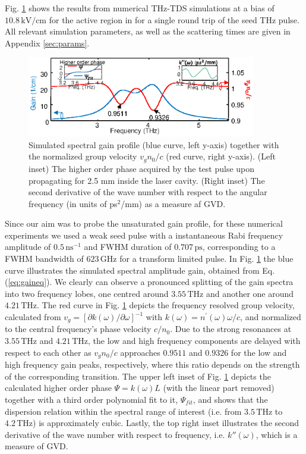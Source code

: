 \documentclass[10pt]{article}
\begin{document}
	Fig. \ref{fig:img03} shows the results from numerical THz-TDS simulations at a
	bias of $10.8{\,}\mathrm{kV/cm}$ for the active region in
	\cite{burghoff2014terahertz} for a single round trip of the seed THz
	pulse\textrm{.} All relevant simulation parameters, as well as the scattering
	times are given in Appendix \ref{sec:params}.
	
	\begin{figure}[h!]
		\begin{center}
			\includegraphics[width=10cm]{THZtds.eps}
		\end{center}
		\caption{Simulated spectral gain profile (blue curve, left y-axis) together
			with the normalized group velocity $v_{g}n_{0}/c$ (red curve, right y-axis).
			(Left inset) The higher order phase acquired by the test pulse upon propagating
			for 2.5 mm inside the laser cavity. (Right inset) The second derivative of the
			wave number with respect to the angular frequency (in units of ps$^{2}$/mm) as
			a measure af GVD. }%
		\label{fig:img03}%
	\end{figure}
	
	Since our aim was to probe the unsaturated gain profile, for these numerical
	experiments we used a weak seed pulse with a instantaneous Rabi frequency
	amplitude of $0.5{\,}\mathrm{ns}^{-1}$ and FWHM duration of $0.707{\,}%
	\mathrm{ps}$, corresponding to a FWHM bandwidth of $623{\,}\mathrm{GHz}$ for a
	transform limited pulse. In Fig. \ref{fig:img03} the blue curve illustrates
	the simulated spectral amplitude gain, obtained from Eq. (\ref{eq:gaineq}). We
	clearly can observe a pronounced splitting of the gain spectra into two
	frequency lobes, one centred around $3.55{\,}\mathrm{THz}$ and another one
	around $4.21{\,}\mathrm{THz}$. The red curve in Fig. \ref{fig:img03} depicts
	the frequency resolved group velocity, calculated from $v_{g}=[\partial
	k(\omega)/\partial\omega]^{-1}$ with $k(\omega)=n^{\prime}(\omega)\omega/c$,
	and normalized to the central frequency's phase velocity $c/n_{0}$.
	Due to the strong resonances at $3.55{\,}\mathrm{THz}$ and $4.21{\,}%
	\mathrm{THz}$, the low and high frequency components are delayed
	with respect to each other as $v_{g}n_{0}/c$ approaches $0.9511$ and $0.9326$
	for the low and high frequency gain peaks, respectively, where this ratio
	depends on the strength of the corresponding transition. The upper left inset
	of Fig. \ref{fig:img03} depicts the calculated higher order phase
	$\Psi=k(\omega)L$ (with the linear part removed) together with a third order
	polynomial fit to it, $\Psi_{fit}$, and shows that the dispersion relation
	within the spectral range of interest (i.e. from $3.5{\,}\mathrm{THz}$ to
	$4.2{\,}\mathrm{THz}$) is approximately cubic. Lastly, the top right inset
	illustrates the second derivative of the wave number with respect to
	frequency, i.e. $k''(\omega)$, which is a measure of GVD.
		
\end{document}
